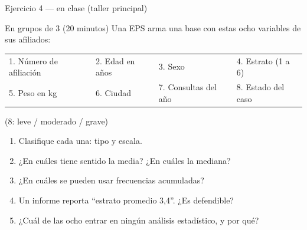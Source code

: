 \documentclass[aspectratio=169,10pt]{beamer}
\begin{document}
\begin{frame}{Ejercicio 4 — en clase (taller principal)}
  \begin{alertblock}{En grupos de 3 (20 minutos)}
    \scriptsize
    Una EPS arma una base con estas ocho variables de sus afiliados:

    \vspace{0.12cm}
    \centering
    \begin{tabular}{@{}llll@{}}
      \toprule
      1. Número de afiliación & 2. Edad en años & 3. Sexo &
      4. Estrato (1 a 6) \\
      5. Peso en kg & 6. Ciudad & 7. Consultas del año &
      8. Estado del caso \\
      \bottomrule
    \end{tabular}
    {\tiny (8: leve / moderado / grave)}

    \vspace{0.18cm}
    \raggedright
    \begin{enumerate}\setlength{\itemsep}{-0.06cm}
      \item Clasifique cada una: tipo y escala.
      \item ¿En cuáles tiene sentido la media? ¿En cuáles la mediana?
      \item ¿En cuáles se pueden usar frecuencias acumuladas?
      \item Un informe reporta ``estrato promedio 3,4''. ¿Es defendible?
      \item ¿Cuál de las ocho  entrar en ningún análisis
            estadístico, y por qué?
    \end{enumerate}
  \end{alertblock}
\end{frame}
\end{document}
